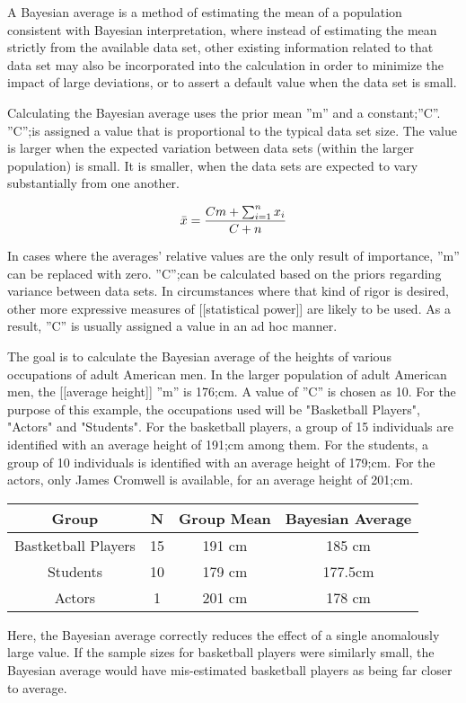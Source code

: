A Bayesian average is a method of estimating the mean of a population consistent with Bayesian interpretation, where instead of estimating the mean strictly from the available data set, other existing information related to that data set may also be incorporated into the calculation in order to minimize the impact of large deviations, or to assert a default value when the data set is small.

Calculating the Bayesian average uses the prior mean ''m'' and a constant;''C''. ''C'';is assigned a value that is proportional to the typical data set size. The value is larger when the expected variation between data sets (within the larger population) is small. It is smaller, when the data sets are expected to vary substantially from one another.

\[  \bar{x} = {Cm + \sum_{i=1}^n{x_i} \over C + n}  \]

In cases where the averages' relative values are the only result of importance, ''m'' can be replaced with zero. ''C'';can be calculated based on the priors regarding variance between data sets. In circumstances where that kind of rigor is desired, other more expressive measures of [[statistical power]] are likely to be used. As a result, ''C'' is usually assigned a value in an ad hoc manner.

The goal is to calculate the Bayesian average of the heights of various occupations of adult American men. In the larger population of adult American men, the [[average height]] ''m'' is 176;cm. A value of ''C'' is chosen as 10. For the purpose of this example, the occupations used will be "Basketball Players", "Actors" and "Students". For the basketball players, a group of 15 individuals are identified with an average height of 191;cm among them. For the students, a group of 10 individuals is identified with an average height of 179;cm. For the actors, only James Cromwell is available, for an average height of 201;cm.


\begin{tabular}{|c|c|c|c|}
	\hline Group & N & Group Mean & Bayesian Average \\ 
	\hline Bastketball Players & 15 & 191 cm & 185 cm \\ 
	\hline Students & 10 & 179 cm & 177.5cm \\ 
	\hline Actors & 1 & 201 cm & 178 cm \\ 
	\hline 
\end{tabular} 
Here, the Bayesian average correctly reduces the effect of a single anomalously large value. If the sample sizes for basketball players were similarly small, the Bayesian average would have mis-estimated basketball players as being far closer to average.
